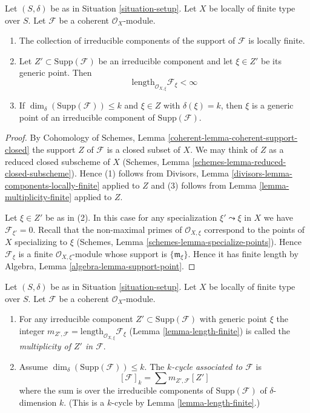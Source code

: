 \begin{lemma}
\label{lemma-length-finite}
Let $(S, \delta)$ be as in Situation \ref{situation-setup}.
Let $X$ be locally of finite type over $S$.
Let $\mathcal{F}$ be a coherent $\mathcal{O}_X$-module.
\begin{enumerate}
\item The collection of irreducible components of the support of
$\mathcal{F}$ is locally finite.
\item Let $Z' \subset \text{Supp}(\mathcal{F})$
be an irreducible component and
let $\xi \in Z'$ be its generic point.
Then
$$
\text{length}_{\mathcal{O}_{X, \xi}} \mathcal{F}_\xi < \infty
$$
\item If $\dim_\delta(\text{Supp}(\mathcal{F})) \leq k$
and $\xi \in Z$ with $\delta(\xi) = k$, then $\xi$ is a
generic point of an irreducible component of $\text{Supp}(\mathcal{F})$.
\end{enumerate}
\end{lemma}

\begin{proof}
By Cohomology of Schemes, Lemma \ref{coherent-lemma-coherent-support-closed}
the support $Z$ of $\mathcal{F}$ is a closed subset of $X$.
We may think of $Z$ as a reduced closed subscheme of $X$
(Schemes, Lemma \ref{schemes-lemma-reduced-closed-subscheme}).
Hence (1) follows from
Divisors, Lemma \ref{divisors-lemma-components-locally-finite} applied to $Z$
and (3) follows from
Lemma \ref{lemma-multiplicity-finite} applied to $Z$.

\medskip\noindent
Let $\xi \in Z'$ be as in (2). In this case for any specialization
$\xi' \leadsto \xi$ in $X$ we have $\mathcal{F}_{\xi'} = 0$.
Recall that the non-maximal primes of $\mathcal{O}_{X, \xi}$ correspond
to the points of $X$ specializing to $\xi$
(Schemes, Lemma \ref{schemes-lemma-specialize-points}).
Hence $\mathcal{F}_\xi$ is a finite $\mathcal{O}_{X, \xi}$-module
whose support is $\{\mathfrak m_\xi\}$. Hence it has finite length
by Algebra, Lemma \ref{algebra-lemma-support-point}.
\end{proof}

\begin{definition}
\label{definition-cycle-associated-to-coherent-sheaf}
Let $(S, \delta)$ be as in Situation \ref{situation-setup}.
Let $X$ be locally of finite type over $S$.
Let $\mathcal{F}$ be a coherent $\mathcal{O}_X$-module.
\begin{enumerate}
\item For any irreducible component $Z' \subset \text{Supp}(\mathcal{F})$
with generic point $\xi$ the integer
$m_{Z', \mathcal{F}} = \text{length}_{\mathcal{O}_{X, \xi}} \mathcal{F}_\xi$
(Lemma \ref{lemma-length-finite})
is called the {\it multiplicity of $Z'$ in $\mathcal{F}$}.
\item Assume $\dim_\delta(\text{Supp}(\mathcal{F})) \leq k$.
The {\it $k$-cycle associated to $\mathcal{F}$} is
$$
[\mathcal{F}]_k
=
\sum m_{Z', \mathcal{F}}[Z']
$$
where the sum is over the irreducible components of
$\text{Supp}(\mathcal{F})$ of $\delta$-dimension $k$.
(This is a $k$-cycle by Lemma \ref{lemma-length-finite}.)
\end{enumerate}
\end{definition}

